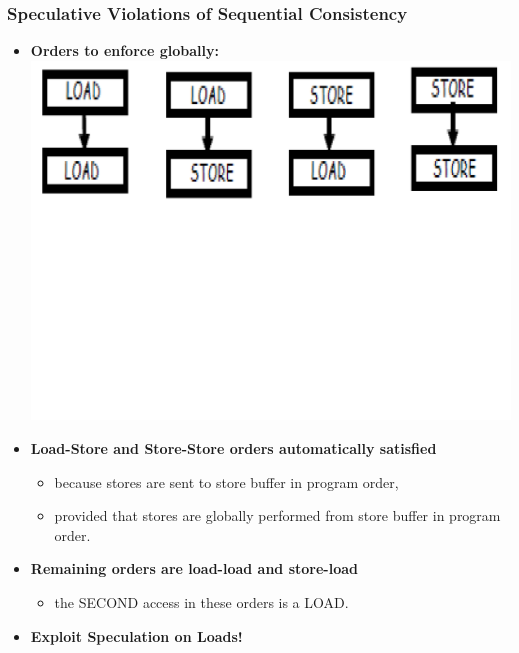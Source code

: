 \documentclass{beamer}
\newcommand{\emp}[1]{\textcolor{DikuRed}{ #1}}
\newcommand{\emphh}[1]{\textcolor{CosGreen}{ #1}}
\begin{document}
\begin{frame}[fragile,t]
\frametitle{Speculative Violations of Sequential Consistency}

\begin{itemize}
\item \emp{\bf Orders to enforce globally:}\\
\includegraphics[width=59ex]{FigsOoOProc/LSorders.pdf}
\vspace{-25ex}

\item \emphh{\bf Load-Store and Store-Store orders automatically satisfied} 
    \begin{itemize}
        \item because stores are sent to store buffer in program order,
        \item provided that stores are globally performed from store buffer
                in program order.
    \end{itemize}\medskip
\item \emp{\bf Remaining orders are load-load and store-load}
    \begin{itemize}
        \item the \emp{SECOND} access in these orders is a \emp{LOAD}.
    \end{itemize}\medskip

\item \alert{\bf Exploit Speculation on Loads!}
\end{itemize}

\end{frame}
\end{document}
